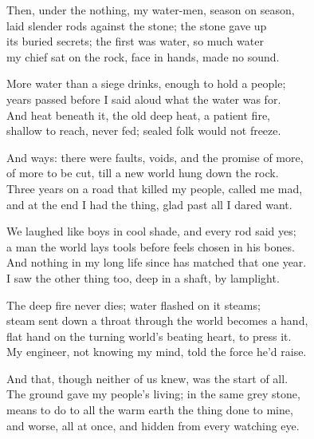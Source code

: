 \begin{founder}
Then, under the nothing, my water-men, season on season,\\
laid slender rods against the stone; the stone gave up\\
its buried secrets; the first was water, so much water\\
my chief sat on the rock, face in hands, made no sound.\\
\medskip

More water than a siege drinks, enough to hold a people;\\
years passed before I said aloud what the water was for.\\
And heat beneath it, the old deep heat, a patient fire,\\
shallow to reach, never fed; sealed folk would not freeze.\\
\medskip

And ways: there were faults, voids, and the promise of more,\\
of more to be cut, till a new world hung down the rock.\\
Three years on a road that killed my people, called me mad,\\
and at the end I had the thing, glad past all I dared want.\\
\medskip

We laughed like boys in cool shade, and every rod said yes;\\
a man the world lays tools before feels chosen in his bones.\\
And nothing in my long life since has matched that one year.\\
I saw the other thing too, deep in a shaft, by lamplight.\\
\medskip

The deep fire never dies; water flashed on it steams;\\
steam sent down a throat through the world becomes a hand,\\
flat hand on the turning world's beating heart, to press it.\\
My engineer, not knowing my mind, told the force he'd raise.\\
\medskip

And that, though neither of us knew, was the start of all.\\
The ground gave my people's living; in the same grey stone,\\
means to do to all the warm earth the thing done to mine,\\
and worse, all at once, and hidden from every watching eye.\\
\medskip


\end{founder}
